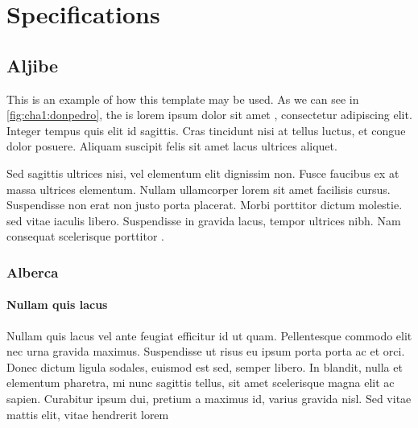 % 
% 
% 



\clearpage
\cleardoublepage

\chapter{Specifications}

\section{Aljibe}

This is an example of how this template may be used. As we can see in \autoref{fig:cha1:donpedro}, the  is lorem ipsum dolor sit amet  \cite{grounding-schemes-sats}, consectetur adipiscing elit. Integer tempus quis elit id sagittis. Cras tincidunt nisi at tellus luctus, et congue dolor posuere. Aliquam suscipit felis sit amet lacus ultrices aliquet. 

Sed sagittis ultrices nisi, vel elementum elit dignissim non. Fusce faucibus ex at massa ultrices elementum. Nullam ullamcorper lorem sit amet facilisis cursus. Suspendisse non erat non justo porta placerat. Morbi porttitor dictum molestie.  sed vitae iaculis libero. Suspendisse in gravida lacus, tempor ultrices nibh. Nam consequat scelerisque porttitor \cite{europa_ce, europa_rohs}.

\subsection{Alberca}

\subsubsection{Nullam quis lacus}

Nullam quis lacus vel ante feugiat efficitur id ut quam. Pellentesque commodo elit nec urna gravida maximus. Suspendisse ut risus eu ipsum porta porta ac et orci. Donec dictum ligula sodales, euismod est sed, semper libero. In blandit, nulla et elementum pharetra, mi nunc sagittis tellus, sit amet scelerisque magna elit ac sapien. Curabitur ipsum dui, pretium a maximus id, varius gravida nisl. Sed vitae mattis elit, vitae hendrerit lorem \cite{un-2030-agenda}

